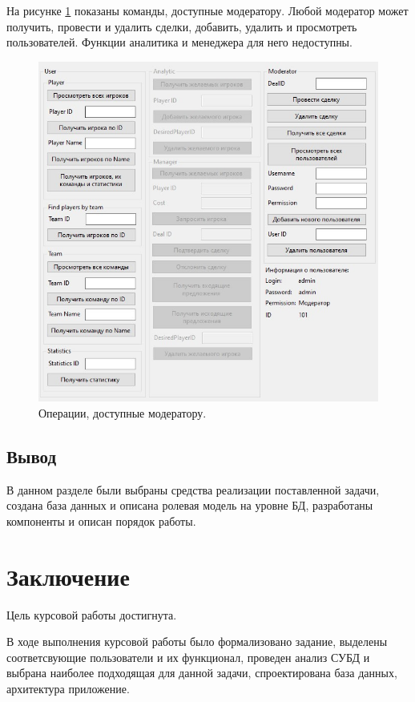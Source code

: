 \clearpage
На рисунке \ref{img:moderator} показаны команды, доступные модератору. Любой модератор может получить, провести и удалить сделки, добавить, удалить и просмотреть пользователей. Функции аналитика и менеджера для него недоступны.
\begin{figure}[h!]
	\centering
	\includegraphics[scale=0.90]{img/moderator.jpg}
	\caption{Операции, доступные модератору.}
	\label{img:moderator}
\end{figure}

\subsection{Вывод}
В данном разделе были выбраны средства реализации поставленной задачи, создана база данных и описана ролевая модель на уровне БД, разработаны компоненты и описан порядок работы.
\newpage
\section*{Заключение}
Цель курсовой работы достигнута.

В ходе выполнения курсовой работы было формализовано задание, выделены соответсвующие пользователи и их функционал, проведен анализ СУБД и выбрана наиболее подходящая для данной задачи, спроектирована база данных, архитектура приложение.

